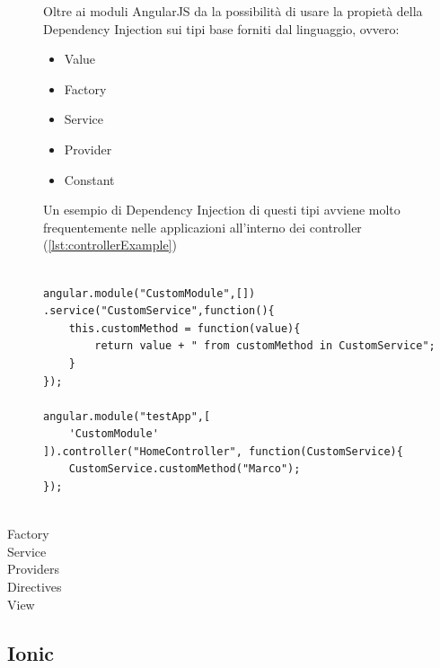 \begin{description}
Oltre ai moduli AngularJS da la possibilità di usare la propietà della Dependency Injection sui tipi base forniti dal linguaggio, ovvero:
\begin{itemize}
\item Value
\item Factory
\item Service
\item Provider
\item Constant
\end{itemize}
Un esempio di Dependency Injection di questi tipi avviene molto frequentemente nelle applicazioni all'interno dei controller (\ref{lst:controllerExample})

\begin{lstlisting}[caption = {Un esempio di creazione di un modulo e la sua inclusione all'interno di un altro}, 
				   label = {lst:controllerExample}]

angular.module("CustomModule",[])
.service("CustomService",function(){
	this.customMethod = function(value){
		return value + " from customMethod in CustomService";	
	}
});

angular.module("testApp",[
	'CustomModule'
]).controller("HomeController", function(CustomService){
	CustomService.customMethod("Marco");
});


\end{lstlisting}

\item[Factory]
\item[Service]
\item[Providers]
\item[Directives]
\item[View]

\end{description} 

\subsection{Ionic}

